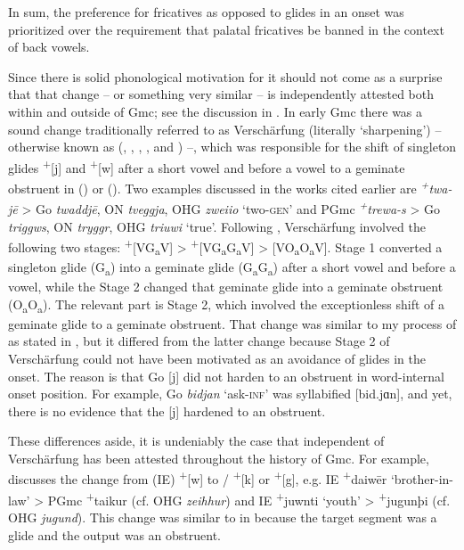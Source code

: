 In sum, the preference for fricatives as opposed to glides in an onset was prioritized over the requirement that palatal fricatives be banned in the context of back vowels.

Since there is solid phonological motivation for  it should not come as a surprise that that change -- or something very similar -- is independently attested both within and outside of Gmc; see the discussion in \citet{Hall2014a}. In early Gmc there was a sound change traditionally referred to as Verschärfung (literally ‘sharpening’) -- otherwise known as  (\citealt{Polomé1949}, \citealt{Kurylowicz1967}, \citealt{Suzuki1990}, \citealt{DavisIverson1996}, and \citealt{Page1999}) --, which was responsible for the shift of  singleton glides \textsuperscript{+}[j] and \textsuperscript{+}[w] after a short vowel and before a vowel to a geminate obstruent in  () or  (). Two examples discussed in the works cited earlier are  \textit{\textsuperscript{+}}\textit{twa-jē} > Go \textit{twaddjē}, ON \textit{tveggja}, OHG \textit{zweiio} ‘two-\textsc{gen}’ and PGmc \textit{\textsuperscript{+}}\textit{trewa-s} > Go \textit{triggws}, ON \textit{tryggr}, OHG \textit{triuwi} ‘true’. Following \citet{Page1999}, Verschärfung involved the following two stages: \textsuperscript{+}[VG\textsubscript{a}V] > \textsuperscript{+}[VG\textsubscript{a}G\textsubscript{a}V] > [VO\textsubscript{a}O\textsubscript{a}V]. Stage 1 converted a singleton glide (G\textsubscript{a}) into a geminate glide (G\textsubscript{a}G\textsubscript{a}) after a short vowel and before a vowel, while the Stage 2 changed that geminate glide into a geminate obstruent (O\textsubscript{a}O\textsubscript{a}). The relevant part is Stage 2, which involved the exceptionless shift of a geminate glide to a geminate obstruent. That change was similar to my process of  as stated in , but it differed from the latter change because Stage 2 of Verschärfung could not have been motivated as an avoidance of glides in the onset. The reason is that Go [j] did not harden to an obstruent in word-internal onset position. For example, Go \textit{bidjan} ‘ask-\textsc{inf}’ was syllabified [bid.jɑn], and yet, there is no evidence that the [j] hardened to an obstruent.

These differences aside, it is undeniably the case that  independent of Verschärfung has been attested throughout the history of Gmc. For example, \citet[174, 183]{Seebold1982} discusses the change from  (IE) \textsuperscript{+}[w] to / \textsuperscript{+}[k] or \textsuperscript{+}[g], e.g. IE \textsuperscript{+}daiwēr ‘brother-in-law’ > PGmc \textsuperscript{+}taikur (cf. OHG \textit{zeihhur}) and IE \textsuperscript{+}juwnti ‘youth’ >  \textsuperscript{+}jugunþi (cf. OHG \textit{jugund}). This change was similar to  in  because the target segment was a glide and the output was an obstruent.

